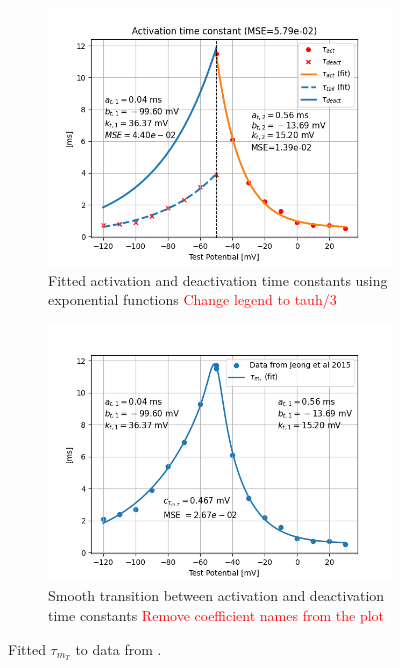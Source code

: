 \documentclass[../main.tex]{subfiles}
\begin{document}
\begin{figure}[!t]
    \centering
    \begin{subfigure}[t]{0.45\textwidth}
        \centering
        \includegraphics[width=\textwidth]{../../reports/workflow/img/t_type_calcium_channel/final_tau_activation_fit.png}
        \caption{Fitted activation and deactivation time constants using exponential functions \textcolor{red}{Change legend to tauh/3}}
        \label{fig:data_fitted_taus_from_jeong_activation}
    \end{subfigure}
    \hfill
    \begin{subfigure}[t]{0.45\textwidth}
        \centering
        \includegraphics[width=\textwidth]{../../reports/workflow/img/t_type_calcium_channel/tau_activation_join_exponentials.png}
        \caption{Smooth transition between activation and deactivation time constants \textcolor{red}{Remove coefficient names from the plot}}
        \label{fig:data_fitted_tau_m_from_jeong_smooth_transition}
    \end{subfigure}
    
    \caption{Fitted $\tau_{m_T}$ to data from \parencite{jeongCaa1TFlyTtype2015}.}
    \label{fig:data_fitted_taus_from_jeong}
\end{figure}
\end{document}
